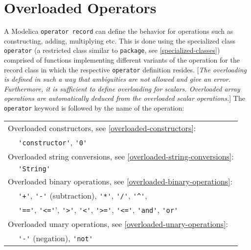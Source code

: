\chapter{Overloaded Operators}

A Modelica \lstinline!operator record! can define the behavior for
operations such as constructing, adding, multiplying etc. This is done
using the specialized class \lstinline!operator! (a restricted class
similar to \lstinline!package!, see \autoref{specialized-classes}) comprised of functions
implementing different variants of the operation for the record class in
which the respective \lstinline!operator! definition resides. {[}\emph{The
overloading is defined in such a way that ambiguities are not allowed
and give an error. Furthermore, it is sufficient to define overloading
for scalars. Overloaded array operations are automatically deduced from
the overloaded scalar operations.}{]} The \lstinline!operator! keyword is
followed by the name of the operation:

%
\begin{longtable}[c]{@{}|ll|@{}}
\hline\endhead
\multicolumn{2}{|l|}{Overloaded constructors, see \autoref{overloaded-constructors}:}\\
& \lstinline!'constructor'!, \lstinline!'0'!\\
\multicolumn{2}{|l|}{Overloaded string conversions, see \autoref{overloaded-string-conversions}:}\\
& \lstinline!'String'! \\
\multicolumn{2}{|l|}{Overloaded binary operations, see \autoref{overloaded-binary-operations}:}\\
& \lstinline!'+'!, \lstinline!'-'! (subtraction), \lstinline!'*'!, \lstinline!'/'!, \lstinline!'^'!,\\
& \lstinline!'=='!, \lstinline!'<='!', \lstinline!'>'!, \lstinline!'<'!,
\lstinline!'>='!, \lstinline!'<='!, \lstinline!'and'!, \lstinline!'or'!\\
\multicolumn{2}{|l|}{Overloaded unary operations, see \autoref{overloaded-unary-operations}:}\\
& \lstinline!'-'! (negation), \lstinline!'not'!\\
\hline
\end{longtable}

